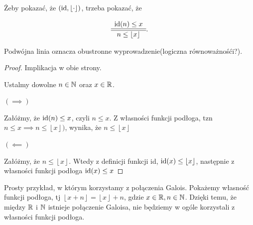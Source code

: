 \begin{center}
\end{center}

Żeby pokazać, że $(\operatorname{id},\left\lfloor \cdot  \right\rfloor)$, trzeba pokazać, że 

\[
\begin{array}{c}
	 \operatorname{id}(n) \le x \\
	\hline\hline
	 n \le \left\lfloor x \right\rfloor 
\end{array}
.\] 

Podwójna linia oznacza obustronne wyprowadzenie(logiczna równoważnośći?).
\begin{proof}
	
	Implikacja w obie strony.

	Ustalmy dowolne $n \in \mathbb{N}$ oraz $x \in \mathbb{R}$. 
	
	$(\implies)$

	Załóżmy, że $\operatorname{id}(n) \le x$, czyli $n \le x$. Z własności funkcji podłoga, tzn $n \le x \implies n\le \left\lfloor x \right\rfloor) $, wynika, że $n \le \left\lfloor x \right\rfloor$
	
	$(\impliedby)$

	Załóżmy, że $n \le \left\lfloor x \right\rfloor$. Wtedy z definicji funkcji id, $\operatorname{id}(x) \le \left\lfloor x \right\rfloor$, następnie z własności funkcji podłoga $\operatorname{id}(x) \le x$
\end{proof}


Prosty przykład, w którym korzystamy z połączenia Galois. Pokażemy własność funkcji podłoga, tj $\left\lfloor x + n \right\rfloor = \left\lfloor x \right\rfloor + n$, gdzie $x \in \mathbb{R}, n \in \mathbb{N}$. Dzięki temu, że między $\mathbb{R}$ i $\mathbb{N}$ istnieje połączenie Galoisa, nie będziemy w ogóle korzystali z własności funkcji podłoga. 

